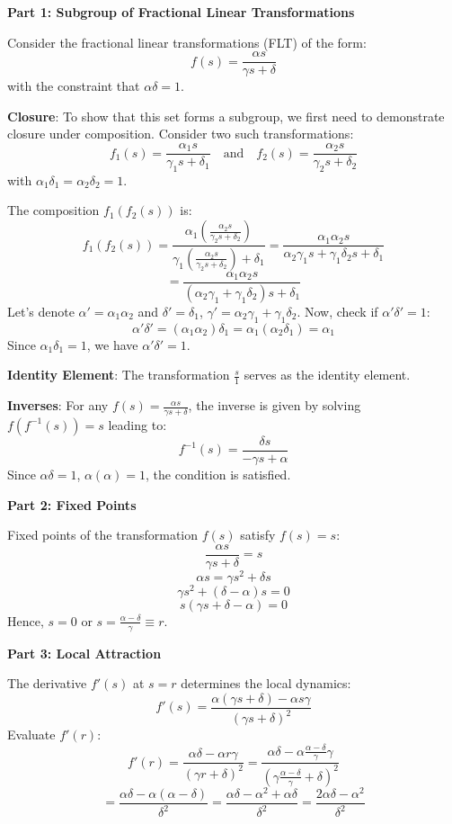 \documentclass[8pt]{article}
\begin{document}
\textbf{Part 1: Subgroup of Fractional Linear Transformations}

Consider the fractional linear transformations (FLT) of the form:
\[ f(s) = \frac{\alpha s}{\gamma s + \delta} \]
with the constraint that \( \alpha \delta = 1 \).

\textbf{Closure}: To show that this set forms a subgroup, we first need to demonstrate closure under composition. Consider two such transformations:
\[ f_1(s) = \frac{\alpha_1 s}{\gamma_1 s + \delta_1} \quad \text{and} \quad f_2(s) = \frac{\alpha_2 s}{\gamma_2 s + \delta_2} \]
with \( \alpha_1 \delta_1 = \alpha_2 \delta_2 = 1 \).

The composition \( f_1(f_2(s)) \) is:
\[ f_1(f_2(s)) = \frac{\alpha_1 \left(\frac{\alpha_2 s}{\gamma_2 s + \delta_2}\right)}{\gamma_1 \left(\frac{\alpha_2 s}{\gamma_2 s + \delta_2}\right) + \delta_1} = \frac{\alpha_1 \alpha_2 s}{\alpha_2 \gamma_1 s + \gamma_1 \delta_2 s + \delta_1} \]
\[ = \frac{\alpha_1 \alpha_2 s}{(\alpha_2 \gamma_1 + \gamma_1 \delta_2) s + \delta_1} \]
Let's denote \( \alpha' = \alpha_1 \alpha_2 \) and \( \delta' = \delta_1 \), \( \gamma' = \alpha_2 \gamma_1 + \gamma_1 \delta_2 \). Now, check if \( \alpha' \delta' = 1 \):
\[ \alpha' \delta' = (\alpha_1 \alpha_2) \delta_1 = \alpha_1 (\alpha_2 \delta_1) = \alpha_1 \]
Since \( \alpha_1 \delta_1 = 1 \), we have \( \alpha' \delta' = 1 \).

\textbf{Identity Element}: The transformation \( \frac{s}{1} \) serves as the identity element.

\textbf{Inverses}: For any \( f(s) = \frac{\alpha s}{\gamma s + \delta} \), the inverse is given by solving \( f(f^{-1}(s)) = s \) leading to:
\[ f^{-1}(s) = \frac{\delta s}{-\gamma s + \alpha} \]
Since \( \alpha \delta = 1 \), \( \alpha (\alpha) = 1 \), the condition is satisfied.

\textbf{Part 2: Fixed Points}

Fixed points of the transformation \( f(s) \) satisfy \( f(s) = s \):
\[ \frac{\alpha s}{\gamma s + \delta} = s \]
\[ \alpha s = \gamma s^2 + \delta s \]
\[ \gamma s^2 + (\delta - \alpha) s = 0 \]
\[ s(\gamma s + \delta - \alpha) = 0 \]
Hence, \( s = 0 \) or \( s = \frac{\alpha - \delta}{\gamma} \equiv r \).

\textbf{Part 3: Local Attraction}

The derivative \( f'(s) \) at \( s = r \) determines the local dynamics:
\[ f'(s) = \frac{\alpha (\gamma s + \delta) - \alpha s \gamma}{(\gamma s + \delta)^2} \]
Evaluate \( f'(r) \):
\[ f'(r) = \frac{\alpha \delta - \alpha r \gamma}{(\gamma r + \delta)^2} = \frac{\alpha \delta - \alpha \frac{\alpha - \delta}{\gamma} \gamma}{(\gamma \frac{\alpha - \delta}{\gamma} + \delta)^2} \]
\[ = \frac{\alpha \delta - \alpha (\alpha - \delta)}{\delta^2} = \frac{\alpha \delta - \alpha^2 + \alpha \delta}{\delta^2} = \frac{2\alpha \delta - \alpha^2}{\delta^2} \]
\end{document}
